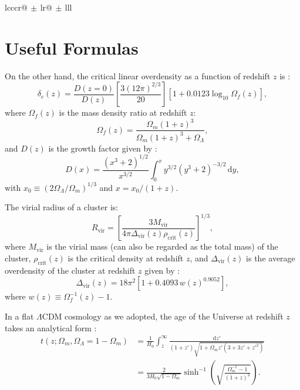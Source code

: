 \documentclass[modern]{aastex62}
\newcommand{\R}[1]{\mathrm{#1}}
\newcommand{\D}[1]{\R{d} #1}
\newcommand{\lcdm}{$\Lambda$CDM}
\begin{document}
\begin{longrotatetable}
\begin{deluxetable*}{lcccr@{$\,\pm\,$}lr@{$\,\pm\,$}lll}
\end{deluxetable*}
\end{longrotatetable}

\section{Useful Formulas}
\label{sec:formulas}


On the other hand, the critical linear overdensity as a function of
redshift $z$ is \citep{kitayama1996,randall2002}:
\begin{equation}
  \label{eq:delta-crit}
  \delta_c(z) = \frac{D(z=0)}{D(z)}
  \left[ \frac{3 (12\pi)^{2/3}}{20} \right]
  \left[1 + 0.0123 \log_{10} \Omega_f(z) \right],
\end{equation}
where $\Omega_f(z)$ is the mass density ratio at redshift $z$:
\begin{equation}
  \label{eq:omega-fz}
  \Omega_f(z) = \frac{\Omega_m(1+z)^3}{\Omega_m(1+z)^3 + \Omega_{\Lambda}},
\end{equation}
and $D(z)$ is the growth factor given by
\citep[Equation~(13.6)]{peebles1980}:
\begin{equation}
  \label{eq:growth-factor}
  D(x) = \frac{(x^3 + 2)^{1/2}}{x^{3/2}}
    \int_0^x y^{3/2} (y^3 + 2)^{-3/2} \,\D{y},
\end{equation}
with $x_0 \equiv (2\Omega_{\Lambda}/\Omega_m)^{1/3}$ and
$x = x_0 / (1+z)$.

The virial radius of a cluster is:
\begin{equation}
  \label{eq:radius-virial}
  R_{\R{vir}} = \left[
    \frac{3 M_{\R{vir}}}{4\pi \Delta_{\R{vir}}(z) \rho_{\R{crit}}(z)}
  \right]^{1/3},
\end{equation}
where $M_{\R{vir}}$ is the virial mass (can also be regarded as
the total mass) of the cluster,
$\rho_{\R{crit}}(z)$ is the critical density at redshift $z$,
and $\Delta_{\R{vir}}(z)$ is the average overdensity of the cluster
at redshift $z$ given by \citep{kitayama1996,cassano2005}:
\begin{equation}
  \label{eq:delta-vir}
  \Delta_{\R{vir}}(z) = 18\pi^2 \left[ 1 + 0.4093 \, w(z)^{0.9052} \right],
\end{equation}
where $w(z) \equiv \Omega_f^{-1}(z) - 1$.

In a flat \lcdm{} cosmology as we adopted, the age of the Universe
at redshift $z$ takes an analytical form
\citep[their Equation~(18)]{thomas2000}:
\begin{align}
  \label{eq:universe-age}
  t(z; \Omega_m, \Omega_{\Lambda}=1-\Omega_m)
    & = \frac{1}{H_0} \int_z^{\infty}
      \frac{\D{z'}}{(1+z')\sqrt{1 + \Omega_m z' (3+3z'+z'^2)}} \nonumber \\
    & = \frac{2}{3 H_0 \sqrt{1-\Omega_m}} \sinh^{-1} \!\left(
      \sqrt{\frac{\Omega_m^{-1} - 1}{(1+z)^3}} \right).
\end{align}





\end{document}
